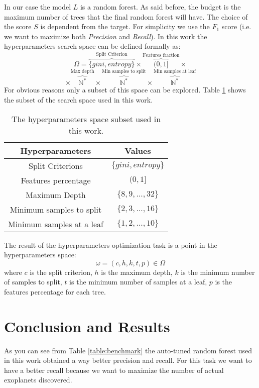 \documentclass[11pt, a4paper]{article}
\begin{document}
  In our case the model $L$ is a random forest. As said before, the budget is the maximum number of trees that the final random forest will have. The choice of the score $S$ is dependent from the target. For simplicity we use the $F_{1}$ score (i.e. we want to maximize both \textit{Precision} and \textit{Recall}). In this work the hyperparameters search space can be defined formally as:
  \[\Omega = \overbrace{\{gini, entropy\}}^{\text{Split Criterion}} \times \overbrace{(0, 1]}^{\text{Features fraction}} \times\]
  \[\times \overbrace{\mathbb{N}^{*}}^{\text{Max depth}} \times \overbrace{\mathbb{N}^{*}}^{\text{Min samples to split}} \times \overbrace{\mathbb{N}^{*}}^{\text{Min samples at leaf}}\]
  For obvious reasons only a subset of this space can be explored. Table \ref{table:hyperparameters} shows the subset of the search space used in this work.

  \begin{table}
    \centering
    \begin{tabular}{|c c|}
      \hline
      Hyperparameters & Values \\
      \hline\hline
      Split Criterions & $\{gini, entropy\}$ \\
      \hline
      Features percentage & $(0, 1]$ \\
      \hline
      Maximum Depth & $\{8,9,...,32\}$ \\
      \hline
      Minimum samples to split & $\{2,3,...,16\}$ \\
      \hline
      Minimum samples at a leaf & $\{1,2,...,10\}$ \\
      \hline
    \end{tabular}
    \caption{The hyperparameters space subset used in this work.}
    \label{table:hyperparameters}
  \end{table}

  The result of the hyperparameters optimization task is a point in the hyperparameters space:
  \[\omega=(c, h, k, t, p)\in\Omega\]
  where $c$ is the split criterion, $h$ is the maximum depth, $k$ is the minimum number of samples to split, $t$ is the minimum number of samples at a leaf, $p$ is the features percentage for each tree.

\section{Conclusion and Results}
  As you can see from Table \ref{table:benchmark} the auto-tuned random forest used in this work obtained a way better precision and recall. For this task we want to have a better recall because we want to maximize the number of actual exoplanets discovered.
\end{document}
